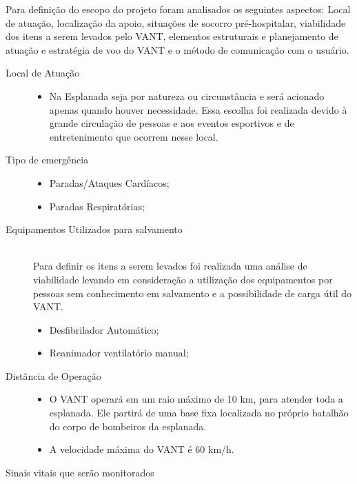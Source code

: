 \label{escopo}
Para definição do escopo do projeto foram analisados os seguintes aspectos: Local de atuação, localização da apoio, situações de socorro pré-hospitalar, viabilidade dos itens a serem levados pelo VANT, elementos estruturais e planejamento de atuação e estratégia de voo do VANT e o método de comunicação com o usuário.
\begin{description}
  \item[Local de Atuação] \hfill 
  	\begin{itemize}
  		\item Na Esplanada seja por natureza ou circunstância e será acionado apenas quando houver necessidade. Essa escolha foi realizada devido à grande circulação de pessoas e aos eventos esportivos e de entretenimento que ocorrem nesse local.

  	\end{itemize}
  \item[Tipo de emergência] \hfill 
  	\begin{itemize}
  		\item Paradas/Ataques Cardíacos;
		\item Paradas Respiratórias;
  	\end{itemize}
  \item[Equipamentos Utilizados para salvamento] \hfill \\
  	Para definir os itens a serem levados foi realizada uma análise de viabilidade levando em consideração a utilização dos equipamentos por pessoas sem conhecimento em salvamento e a possibilidade de carga útil do VANT.
  	\begin{itemize}
		\item Desfibrilador Automático;
		\item Reanimador ventilatório manual;
  	\end{itemize}
  \item[Distância de Operação] \hfill 
  	\begin{itemize}
	  
	\item O VANT operará em um raio máximo de 10 km, para atender toda a esplanada.
	  \subitem Ele partirá de uma base fixa localizada no próprio batalhão do corpo de bombeiros da esplanada.

	\item A velocidade máxima do VANT é 60 km/h.
	  
  	\end{itemize}
  \item[Sinais vitais que serão monitorados] \hfill 
  	\begin{itemize}
	

\end{itemize}
\end{description}
